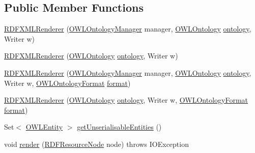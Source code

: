 \subsection*{Public Member Functions}
\begin{DoxyCompactItemize}
\item 
\hyperlink{classorg_1_1coode_1_1owlapi_1_1rdf_1_1rdfxml_1_1_r_d_f_x_m_l_renderer_aa2312dc11e73cc9bb7a51a7f52da7633}{R\-D\-F\-X\-M\-L\-Renderer} (\hyperlink{interfaceorg_1_1semanticweb_1_1owlapi_1_1model_1_1_o_w_l_ontology_manager}{O\-W\-L\-Ontology\-Manager} manager, \hyperlink{interfaceorg_1_1semanticweb_1_1owlapi_1_1model_1_1_o_w_l_ontology}{O\-W\-L\-Ontology} \hyperlink{classorg_1_1coode_1_1owlapi_1_1rdf_1_1renderer_1_1_r_d_f_renderer_base_a1c2e169e03ca2cdf866ca19387b258e4}{ontology}, Writer w)
\item 
\hyperlink{classorg_1_1coode_1_1owlapi_1_1rdf_1_1rdfxml_1_1_r_d_f_x_m_l_renderer_a757f42f6607800d4ced9f8d9299b8210}{R\-D\-F\-X\-M\-L\-Renderer} (\hyperlink{interfaceorg_1_1semanticweb_1_1owlapi_1_1model_1_1_o_w_l_ontology}{O\-W\-L\-Ontology} \hyperlink{classorg_1_1coode_1_1owlapi_1_1rdf_1_1renderer_1_1_r_d_f_renderer_base_a1c2e169e03ca2cdf866ca19387b258e4}{ontology}, Writer w)
\item 
\hyperlink{classorg_1_1coode_1_1owlapi_1_1rdf_1_1rdfxml_1_1_r_d_f_x_m_l_renderer_ab97b1c323e7f961dd13a5ea0b02588c7}{R\-D\-F\-X\-M\-L\-Renderer} (\hyperlink{interfaceorg_1_1semanticweb_1_1owlapi_1_1model_1_1_o_w_l_ontology_manager}{O\-W\-L\-Ontology\-Manager} manager, \hyperlink{interfaceorg_1_1semanticweb_1_1owlapi_1_1model_1_1_o_w_l_ontology}{O\-W\-L\-Ontology} \hyperlink{classorg_1_1coode_1_1owlapi_1_1rdf_1_1renderer_1_1_r_d_f_renderer_base_a1c2e169e03ca2cdf866ca19387b258e4}{ontology}, Writer w, \hyperlink{classorg_1_1semanticweb_1_1owlapi_1_1model_1_1_o_w_l_ontology_format}{O\-W\-L\-Ontology\-Format} \hyperlink{classorg_1_1coode_1_1owlapi_1_1rdf_1_1rdfxml_1_1_r_d_f_x_m_l_renderer_a39fbe41be19c78ddc53658620bb01f16}{format})
\item 
\hyperlink{classorg_1_1coode_1_1owlapi_1_1rdf_1_1rdfxml_1_1_r_d_f_x_m_l_renderer_a09ce5f546b907b05a1135b5eafbd5e85}{R\-D\-F\-X\-M\-L\-Renderer} (\hyperlink{interfaceorg_1_1semanticweb_1_1owlapi_1_1model_1_1_o_w_l_ontology}{O\-W\-L\-Ontology} \hyperlink{classorg_1_1coode_1_1owlapi_1_1rdf_1_1renderer_1_1_r_d_f_renderer_base_a1c2e169e03ca2cdf866ca19387b258e4}{ontology}, Writer w, \hyperlink{classorg_1_1semanticweb_1_1owlapi_1_1model_1_1_o_w_l_ontology_format}{O\-W\-L\-Ontology\-Format} \hyperlink{classorg_1_1coode_1_1owlapi_1_1rdf_1_1rdfxml_1_1_r_d_f_x_m_l_renderer_a39fbe41be19c78ddc53658620bb01f16}{format})
\item 
Set$<$ \hyperlink{interfaceorg_1_1semanticweb_1_1owlapi_1_1model_1_1_o_w_l_entity}{O\-W\-L\-Entity} $>$ \hyperlink{classorg_1_1coode_1_1owlapi_1_1rdf_1_1rdfxml_1_1_r_d_f_x_m_l_renderer_a292eae63a08fcb3dad962f3a459f9ec5}{get\-Unserialisable\-Entities} ()
\item 
void \hyperlink{classorg_1_1coode_1_1owlapi_1_1rdf_1_1rdfxml_1_1_r_d_f_x_m_l_renderer_a1c3befb6b6bae582fcf449963c5c3196}{render} (\hyperlink{classorg_1_1coode_1_1owlapi_1_1rdf_1_1model_1_1_r_d_f_resource_node}{R\-D\-F\-Resource\-Node} node)  throws I\-O\-Exception 
\end{DoxyCompactItemize}
